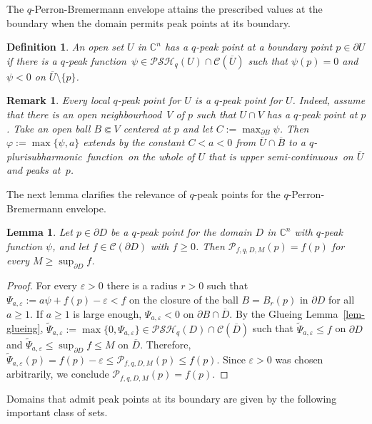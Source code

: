 \documentclass[10pt,a4paper]{amsart}
\newtheorem{lem}[thm]{Lemma}
\newtheorem{defn}[thm]{Definition}
\newtheorem{rem}[thm]{Remark}
\numberwithin{equation}{section}
\newcommand{\cbb}{\mathbb{C}}
\newcommand{\ccal}{\mathcal{C}}
\newcommand{\pcal}{\mathcal{P}}
\newcommand{\qpsh}{$q$-pluri\-sub\-harmonic}
\newcommand{\PSH}{\mathcal{PSH}}
\newcommand{\cl}[1]{\overline{#1}}
\newcommand{\nbh}{neighbourhood}
\newcommand{\usc}{upper semi-continuous}
\newcommand{\fct}{function}
\newcommand{\cld}{\overline{D}}
\newcommand{\relc}{\Subset}
\newcommand{\eps}{\varepsilon}
\begin{document}
The $q$-Perron-Bremermann envelope attains the prescribed values at the boundary when the domain permits peak points at its boundary.

\begin{defn}\label{defn-q-peak} An open set $U$ in $\cbb^n$ has a \textit{$q$-peak point} at a boundary point $p \in \partial U$ if there is a \textit{$q$-peak \fct}\ $\psi \in \PSH_q(U) \cap \ccal(\cl{U})$ such that $\psi(p)=0$ and $\psi<0$ on $\cl{U}\setminus\{p\}$.
\end{defn}

\begin{rem} Every \textit{local} $q$-peak point for $U$ is a $q$-peak point for $U$. Indeed, assume that there is an open \nbh\ $V$ of $p$ such that $U \cap V$ has a $q$-peak point at $p$. Take an open ball $B \relc V$ centered at $p$ and let $C:=\max_{\partial B} \psi$. Then $\varphi:=\max\{\psi,a\}$ extends by the constant $C<a<0$ from $\cl{U} \cap \cl{B}$ to a \qpsh\ \fct\ on the whole of $U$ that is \usc\ on $\cl{U}$ and peaks at~$p$.
\end{rem}

The next lemma clarifies the relevance of $q$-peak points for the $q$-Perron-Bremermann envelope.

\begin{lem}\label{lem-q-peak} Let $p \in \partial D$ be a $q$-peak point for the domain $D$ in $\cbb^n$ with $q$-peak function $\psi$, and let $f \in \ccal(\partial D)$ with $f \geq0$. Then $\pcal_{f,q,D,M}(p) = f(p)$ for every $M \geq \sup_{\partial D} f$.
\end{lem}

\begin{proof} For every $\eps>0$ there is a radius $r>0$ such that $\Psi_{a,\eps}:=a\psi+f(p)-\eps < f$ on the closure of the ball $B=B_r(p)$ in $\partial D$ for all $a\geq1$. If $a\geq1$ is large enough, $\Psi_{a,\eps} < 0$ on $\partial B \cap \cld$. By the Glueing Lemma~\ref{lem-glueing}, $\widetilde{\Psi}_{a,\eps}:=\max\{0,\Psi_{a,\eps}\} \in \PSH_q(D)\cap\ccal(\cld)$ such that $\widetilde{\Psi}_{a,\eps} \leq f$ on $\partial D$ and $\widetilde{\Psi}_{a,\eps} \leq \sup_{\partial D} f \leq M$ on $\cld$. Therefore, $\widetilde{\Psi}_{a,\eps}(p)=f(p)-\eps \leq \pcal_{f,q,D,M}(p) \leq f(p)$. Since $\eps>0$ was chosen arbitrarily, we conclude $\pcal_{f,q,D,M}(p) = f(p)$.
\end{proof}

Domains that admit peak points at its boundary are given by the following important class of sets.
\end{document}

